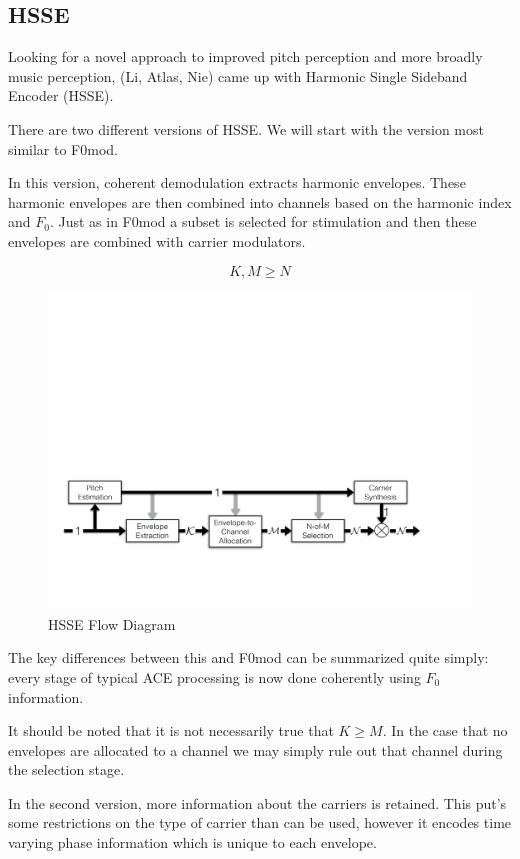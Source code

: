 \documentclass [11pt, proquest,oneside] {ganter_thesis}[2015/03/03]
\begin{document}
\subsection{HSSE}

Looking for a novel approach to improved pitch perception and more broadly music perception, (Li, Atlas, Nie) came up with Harmonic Single Sideband Encoder (HSSE).

There are two different versions of HSSE.  We will start with the version most similar to F0mod.

In this version, coherent demodulation extracts harmonic envelopes.  These harmonic envelopes are then combined into channels based on the harmonic index and $F_0$.  Just as in F0mod a subset is selected for stimulation and then these envelopes are combined with carrier modulators.

$$K, M \geq N$$

\begin{figure}[!ht]
  \centering
    \includegraphics[width=1\textwidth]{HSSE_flow_diagram_noPhase}   
    \caption{HSSE Flow Diagram}\label{fig:HSSE_flow_1}
\end{figure}

The key differences between this and F0mod can be summarized quite simply: every stage of typical ACE processing is now done coherently using $F_0$ information.

It should be noted that it is not necessarily true that $K \geq M$.  In the case that no envelopes are allocated to a channel we may simply rule out that channel during the selection stage.

In the second version, more information about the carriers is retained.  This put's some restrictions on the type of carrier than can be used, however it encodes time varying phase information which is unique to each envelope.
\end{document}
